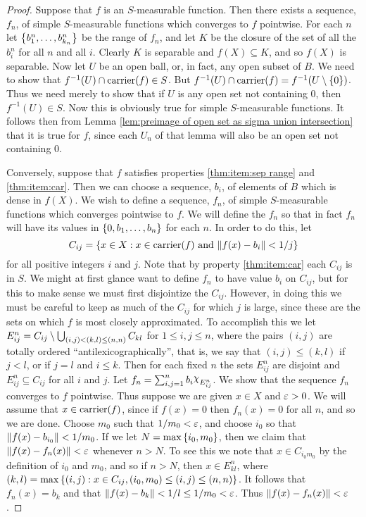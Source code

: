 \begin{proof}
Suppose that $f$ is an $S$-measurable function. Then there exists a sequence, $f_n$, of simple $S$-measurable functions which converges to $f$ pointwise. For each $n$ let $\left\{b_1^n,\dots,b_{k_n}^n\right\}$ be the range of $f_n$, and let $K$ be the closure of the set of all the $b_i^n$ for all $n$ and all $i$. Clearly $K$ is separable and $f(X)\subseteq K$, and so $f(X)$ is separable. Now let $U$ be an open ball, or, in fact, any open subset of $B$. We need to show that $f^{-1}(U)\cap\operatorname{carrier}(f)\in S$. But $f^{-1}(U)\cap\operatorname{carrier}(f)=f^{-1}(U\setminus\left\{0\right\})$. Thus we need merely to show that if $U$ is any open set not containing 0, then $f^{-1}(U)\in S$. Now this is obviously true for simple $S$-measurable functions. It follows then from Lemma \ref{lem:preimage of open set as sigma union intersection} that it is true for $f$, since each $U_n$ of that lemma will also be an open set not containing 0.

Conversely, suppose that $f$ satisfies properties \ref{thm:item:sep range} and \ref{thm:item:car}. Then we can choose a sequence, $b_i$, of elements of $B$ which is dense in $f(X)$. We wish to define a sequence, $f_n$, of simple $S$-measurable functions which converges pointwise to $f$. We will define the $f_n$ so that in fact $f_n$ will have its values in $\left\{0,b_1,\dots,b_n\right\}$ for each $n$. In order to do this, let $$C_{ij}=\left\{x\in X:x\in\operatorname{carrier}(f)\text{ and }\norm{f(x)-b_i}<1/j\right\}$$ for all positive integers $i$ and $j$. Note that by property \ref{thm:item:car} each $C_{ij}$ is in $S$. We might at first glance want to define $f_n$ to have value $b_i$ on $C_{ij}$, but for this to make sense we must first disjointize the $C_{ij}$. However, in doing this we must be careful to keep as much of the $C_{ij}$ for which $j$ is large, since these are the sets on which $f$ is most closely approximated. To accomplish this we let $E_{i j}^n=C_{ij}\setminus\bigcup_{(i,j)<(k,l)\leq(n,n)}C_{kl}$ for $1\leq i,j\leq n$, where the pairs $(i,j)$ are totally ordered ``antilexicographically'', that is, we say that $(i,j)\leq(k,l)$ if $j<l$, or if $j=l$ and $i\leq k$. Then for each fixed $n$ the sets $E_{i j}^n$ are disjoint and $E_{ij}^n\subseteq C_{ij}$ for all $i$ and $j$. Let $f_n=\sum_{i,j=1}^nb_i\idf{E_{ij}^n}$. We show that the sequence $f_n$ converges to $f$ pointwise. Thus suppose we are given $x\in X$ and $\varepsilon>0$. We will assume that $x\in\operatorname{carrier}(f)$, since if $f(x)=0$ then $f_n(x)=0$ for all $n$, and so we are done. Choose $m_0$ such that $1/m_0<\varepsilon$, and choose $i_0$ so that $\norm{f(x)-b_{i_0}}<1/m_0$. If we let $N=\max\left\{i_0, m_0\right\}$, then we claim that $\norm{f(x)-f_n(x)}<\varepsilon$ whenever $n>N$. To see this we note that $x\in C_{i_0m_0}$ by the definition of $i_0$ and $m_0$, and so if $n>N$, then $x\in E^n_{kl}$, where $(k,l)=\max\left\{(i,j):x\in C_{ij},(i_0,m_0)\leq(i,j)\leq(n, n)\right\}$. It follows that $f_n(x)=b_k$ and that $\norm{f(x)-b_k}<1/l\leq 1/m_0<\varepsilon$. Thus $\norm{f(x)-f_n(x)}<\varepsilon$.
\end{proof}


